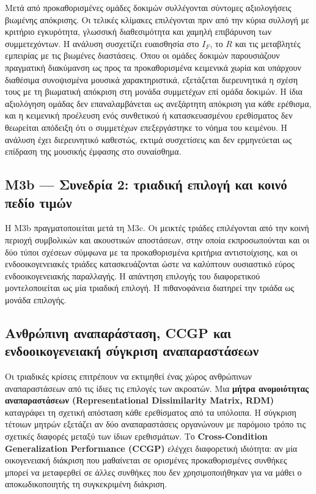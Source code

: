 \documentclass[11pt,a4paper]{article}
\begin{document}
Μετά από προκαθορισμένες ομάδες δοκιμών συλλέγονται σύντομες αξιολογήσεις βιωμένης απόκρισης. Οι τελικές κλίμακες επιλέγονται πριν από την κύρια συλλογή με κριτήριο εγκυρότητα, γλωσσική διαθεσιμότητα και χαμηλή επιβάρυνση των συμμετεχόντων. Η ανάλυση συσχετίζει ευαισθησία στο $I_F$, το $R$ και τις μεταβλητές εμπειρίας με τις βιωμένες διαστάσεις. Όπου οι ομάδες δοκιμών παρουσιάζουν πραγματική διακύμανση ως προς τα προκαθορισμένα κειμενικά χωρία και υπάρχουν διαθέσιμα συνοψισμένα μουσικά χαρακτηριστικά, εξετάζεται διερευνητικά η σχέση τους με τη βιωματική απόκριση στη μονάδα συμμετέχων επί ομάδα δοκιμών. Η ίδια αξιολόγηση ομάδας δεν επαναλαμβάνεται ως ανεξάρτητη απόκριση για κάθε ερέθισμα, και η κειμενική προέλευση ενός συνθετικού ή κατασκευασμένου ερεθίσματος δεν θεωρείται απόδειξη ότι ο συμμετέχων επεξεργάστηκε το νόημα του κειμένου. Η ανάλυση έχει διερευνητικό καθεστώς, εκτιμά συσχετίσεις και δεν ερμηνεύεται ως επίδραση της μουσικής έμφασης στο συναίσθημα.

\subsection{M3b — Συνεδρία 2: τριαδική επιλογή και κοινό πεδίο τιμών}\label{app:human-m3b-task}

Η M3b πραγματοποιείται μετά τη M3c. Οι μεικτές τριάδες επιλέγονται από την κοινή περιοχή συμβολικών και ακουστικών αποστάσεων, στην οποία εκπροσωπούνται και οι δύο τύποι σχέσεων σύμφωνα με τα προκαθορισμένα κριτήρια αντιστοίχισης, και οι ενδοοικογενειακές τριάδες κατασκευάζονται ώστε να καλύπτουν ουσιαστικό εύρος ενδοοικογενειακής παραλλαγής. Η απάντηση επιλογής του διαφορετικού μοντελοποιείται ως μία τριαδική επιλογή. Η πιθανοφάνεια διατηρεί την τριάδα ως μονάδα επιλογής.

\subsection{Ανθρώπινη αναπαράσταση, CCGP και ενδοοικογενειακή σύγκριση αναπαραστάσεων}\label{app:human-geometry}

Οι τριαδικές κρίσεις επιτρέπουν να εκτιμηθεί ένας χώρος ανθρώπινων αναπαραστάσεων από τις ίδιες τις επιλογές των ακροατών. Μια \textbf{μήτρα ανομοιότητας αναπαραστάσεων (Representational Dissimilarity Matrix, RDM)} καταγράφει τη σχετική απόσταση κάθε ερεθίσματος από τα υπόλοιπα. Η σύγκριση τέτοιων μητρών εξετάζει αν δύο αναπαραστάσεις οργανώνουν με παρόμοιο τρόπο τις σχετικές διαφορές μεταξύ των ίδιων ερεθισμάτων. Το \textbf{Cross-Condition Generalization Performance (CCGP)} ελέγχει διαφορετική ιδιότητα: αν μία οικογενειακή διάκριση που μαθαίνεται σε ορισμένες προκαθορισμένες συνθήκες μπορεί να μεταφερθεί σε άλλες συνθήκες που δεν χρησιμοποιήθηκαν για να μάθει ο αποκωδικοποιητής τη συγκεκριμένη διάκριση.
\end{document}
